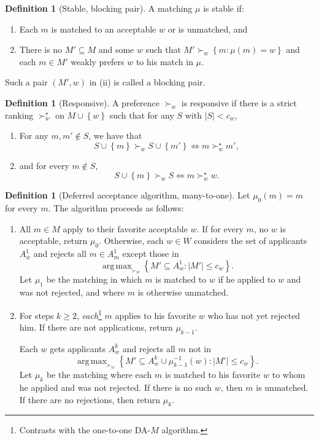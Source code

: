 \documentclass[10pt]{article}
\numberwithin{equation}{section}
\DeclareMathOperator*{\argmax}{arg\,max}
\theoremstyle{definition}
\newtheorem{definition}[theorem]{Definition}
\begin{document}
\begin{definition}[Stable, blocking pair]
	A matching $\mu$ is stable if:
	\begin{enumerate}[label = (\roman*)]
		\item Each $m$ is matched to an acceptable $w$ or is unmatched, and 
		\item There is no $M' \subseteq M$ and some $w$ such that $M' \succ_w \left\{m: \mu(m) = w\right\}$ and each $m \in M'$ weakly prefers $w$ to his match in $\mu$.
	\end{enumerate}
	Such a pair $(M',w)$ in (ii) is called a blocking pair.
\end{definition}

\begin{definition}[Responsive]
	A preference $\succ_w$ is responsive if there is a strict ranking $\succ_w^\star$ on $M\cup \left\{w\right\}$ such that for any $S$ with $\left| S \right| < c_w$,\begin{enumerate}[label = (\roman*)]
		\item For any $m,m' \not\in S$, we have that \[
			S \cup \left\{m\right\} \succ_w S \cup \left\{m'\right\} \iff m \succ_w^\star m'
		,\] 
		\item and for every $m \not\in S$, \[
			S \cup \left\{m\right\} \succ_w S \iff m \succ_w^\star w
		.\]  
	\end{enumerate}
\end{definition}

\begin{definition}[Deferred acceptance algorithm, many-to-one]
	Let $\mu_0(m) = m$ for every $m$.
	The algorithm proceeds as follows:
	\begin{enumerate}[label = (\roman*)]
		\item All $m \in M$ apply to their favorite acceptable $w$. If for every $m$, no $w$ is acceptable, return $\mu_0$. Otherwise, each $w \in W$ considers the set of applicants $A_w^{1}$ and rejects all $m \in A_m^{1}$ except those in \[
			\argmax_{\succ_w} \left\{M' \subseteq A_w^{1}: \left| M' \right| \le c_w\right\}
		.\] Let $\mu_1$ be the matching in which $m$ is matched to $w$ if he applied to $w$ and was not rejected, and where $m$ is otherwise unmatched.
		\item For steps $k\ge 2$, \emph{each}\footnote{Contrasts with the one-to-one DA-$M$ algorithm.} $m$ applies to his favorite $w$ who has not yet rejected him. If there are not applications, return $\mu_{k-1}$.

		Each $w$ gets applicants $A_w^{k}$ and rejects all $m$ not in \[
			\argmax_{\succ_w} \left\{M' \subseteq A_w^{k} \cup \mu_{k-1}^{-1}(w): \left| M' \right| \le c_w\right\}
		.\] 
		Let $\mu_k$ be the matching where each $m$ is matched to his favorite $w$ to whom he applied and was not rejected. If there is no such $w$, then $m$ is unmatched.
		If there are no rejections, then return $\mu_k$.
	\end{enumerate}
\end{definition}
\end{document}

